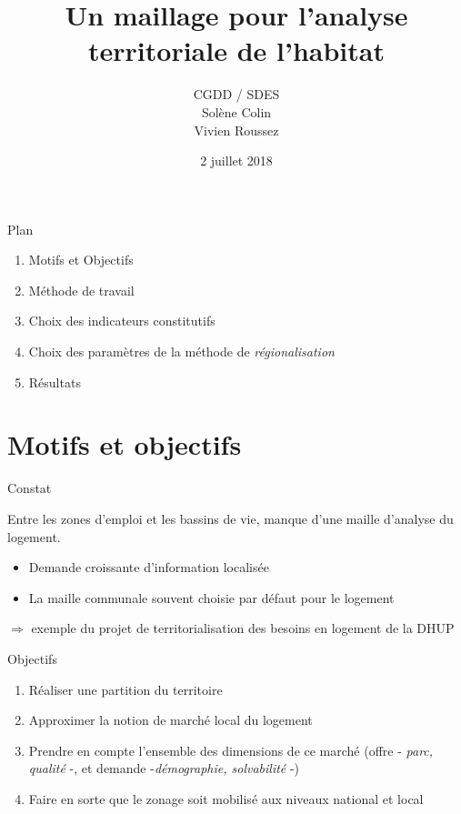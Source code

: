 \documentclass[11pt]{beamer}
\date{2 juillet 2018}
\author{CGDD / SDES \\ Solène Colin \\ Vivien Roussez}
\title{Un maillage pour l'analyse territoriale de l'habitat }
\begin{document}
\begin{frame}
\titlepage
\end{frame}

\begin{frame}{Plan}
\begin{enumerate}

\item Motifs et Objectifs

\item Méthode de travail

\item Choix des indicateurs constitutifs

\item Choix des paramètres de la méthode de \emph{régionalisation}

\item Résultats 

\vfill
\end{enumerate}
\end{frame}

\section{Motifs et objectifs}

\begin{frame}{Constat}

Entre les zones d'emploi et les bassins de vie, manque d'une maille d'analyse du logement.
\vspace{.3cm}

\begin{itemize}
\item Demande croissante d'information localisée
\item La maille communale souvent choisie par défaut pour le logement
\end{itemize}
\vspace{.3cm}
$\Rightarrow$ exemple du projet de territorialisation des besoins en logement de la DHUP
\end{frame}

\begin{frame}{Objectifs}
\begin{enumerate}
\item Réaliser une partition du territoire
\item Approximer la notion de marché local du logement
\item Prendre en compte l'ensemble des dimensions de ce marché (offre - \emph{parc, qualité} -, et demande -\emph{démographie, solvabilité} -)
\item Faire en sorte que le zonage soit mobilisé aux niveaux national et local
\end{enumerate}
\end{frame}
\end{document}
